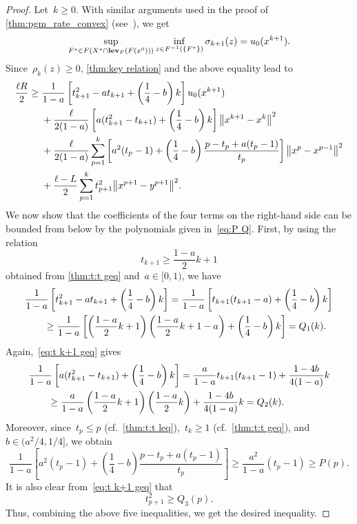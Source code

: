 \documentclass[../main]{subfiles}
\begin{document}
\begin{proof}    
    Let~$k \ge 0$.
    With similar arguments used in the proof of \cref{thm:pgm_rate_convex} (see~\cite[Theorem 5.2]{Tanabe2022a}), we get
    \[
        \sup_{F^\ast \in F(X^\ast \cap \level_F(F(x^0)))} \inf_{z \in F^{-1}(\set*{F^\ast})} \sigma_{k + 1}(z) = u_0(x^{k + 1})
    .\] 
    Since~$\rho_k(z) \ge 0$, \cref{thm:key relation} and the above equality lead to
    \begin{align}
        \frac{\ell R}{2} \ge{}& \frac{1}{1 - a} \left[ t_{k + 1}^2 - a t_{k + 1} + \left( \frac{1}{4} - b \right) k \right] u_0(x^{k + 1}) \\
        &+ \frac{\ell}{2 (1 - a)} \left[ a (t_{k + 1}^2 - t_{k + 1}) + \left( \frac{1}{4} - b \right) k \right] \norm*{x^{k + 1} - x^k}^2 \\
        &+ \frac{\ell}{2 (1 - a)} \sum_{p = 1}^{k} \left[ a^2 (t_p - 1) + \left( \frac{1}{4} - b \right) \frac{p - t_p + a(t_p - 1)}{t_p} \right] \norm*{x^p - x^{p - 1}}^2 \\
        &+ \frac{\ell - L}{2} \sum_{p = 1}^{k} t_{p + 1}^2 \norm*{x^{p + 1} - y^{p + 1}}^2
    .\end{align}
    We now show that the coefficients of the four terms on the right-hand side can be bounded from below by the polynomials given in~\cref{eq:P Q}.
    First, by using the relation
    \[ \label{eq:t k+1 geq}
        t_{k + 1} \ge \frac{1 - a}{2} k + 1
    \] 
    obtained from \cref{thm:t:t geq} and~$a \in [0, 1)$, we have
    \begin{align}
        \MoveEqLeft \frac{1}{1 - a} \left[ t_{k + 1}^2 - a t_{k + 1} + \left( \frac{1}{4} - b \right) k \right] = \frac{1}{1 - a} \left[ t_{k + 1} (t_{k + 1} - a) + \left( \frac{1}{4} - b \right) k \right] \\
        &\ge \frac{1}{1 - a} \left[ \left( \frac{1 - a}{2} k + 1 \right) \left( \frac{1 - a}{2} k + 1 - a \right) + \left( \frac{1}{4} - b \right) k \right] = Q_1(k)
    .\end{align}
    Again,~\cref{eq:t k+1 geq} gives
    \begin{align}
        \MoveEqLeft \frac{1}{1 - a} \left[ a (t_{k + 1}^2 - t_{k + 1}) + \left( \frac{1}{4} - b \right) k \right] 
        = \frac{a}{1 - a} t_{k + 1} (t_{k + 1} - 1) + \frac{1 - 4 b}{4 (1 - a)} k \\
        &\ge \frac{a}{1 - a} \left( \frac{1 - a}{2} k + 1 \right) \left( \frac{1 - a}{2} k \right) + \frac{1 - 4 b}{4 (1 - a)} k = Q_2(k)
    .\end{align}
    Moreover, since~$t_p \le p$ (cf.~\cref{thm:t:t leq}),~$t_k \ge 1$ (cf.~\cref{thm:t:t geq}), and~$b \in (a^2 / 4, 1 / 4]$, we obtain
    \[
        \frac{1}{1 - a} \left[ a^2 (t_p - 1) + \left( \frac{1}{4} - b \right) \frac{p - t_p + a (t_p - 1)}{t_p} \right] \ge \frac{a^2}{1 - a} (t_p - 1) \ge P(p)
    .\] 
    It is also clear from~\cref{eq:t k+1 geq} that
    \[
        t_{p + 1}^2 \ge Q_3(p)
    .\] 
    Thus, combining the above five inequalities, we get the desired inequality.
\end{proof}
\end{document}
